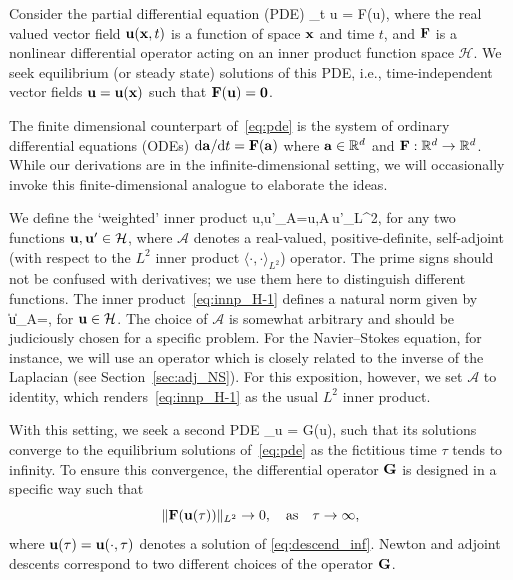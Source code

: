 \documentclass{article}
\begin{document}
Consider the partial differential equation (PDE)
\beq
\partial_t \vc u = \vc F(\vc u),
\label{eq:pde}
\eeq
where the real valued vector field
$\mathbf u(\mathbf x,t)$ is a function of space $\mathbf x$ and time $t$, and
$\mathbf F$ is a nonlinear differential operator acting on an inner product function space
$\mathcal H$. We seek equilibrium (or steady state) solutions of this PDE, i.e.,
time-independent vector fields $\mathbf u=\mathbf u(\mathbf x)$ such that $\mathbf F(\mathbf u)=\mathbf 0$.

The finite dimensional counterpart of~\eqref{eq:pde} is the system of ordinary differential
equations (ODEs) $\mbox d\mathbf a/\mbox d t=\mathbf F(\mathbf a)$ where $\mathbf a\in\mathbb R^d$ and
$\mathbf F:\mathbb R^d\to\mathbb R^d$. While our derivations are in the infinite-dimensional setting,
we will occasionally invoke this finite-dimensional analogue to elaborate the ideas.

We define the `weighted' inner product
\beq
\langle \vc u,\vc u'\rangle_{\mathcal A}=\langle \vc u,\mathcal A\,\vc u'\rangle_{L^2},
\label{eq:innp_H-1}
\eeq
for any two functions $\mathbf u,\mathbf u'\in\mathcal H$,
where $\mathcal A$ denotes a real-valued, positive-definite, self-adjoint (with respect to the $L^2$
inner product $\langle\cdot,\cdot\rangle_{L^2}$) operator.
The prime signs should not be confused with derivatives; we use them here
to distinguish different functions.
The inner product~\eqref{eq:innp_H-1} defines a natural norm given by
\beq
\|\vc u\|_{\mathcal A}=,
\label{eq:normA}
\eeq
for $\mathbf u\in\mathcal H$.
The choice of $\mathcal A$ is somewhat arbitrary and 
should be judiciously chosen for a specific
problem. For the Navier--Stokes equation, for instance, we will use an operator
which is closely related to the inverse of the Laplacian (see Section~\ref{sec:adj_NS}).
For this exposition, however, we set $\mathcal A$ to identity, which renders~\eqref{eq:innp_H-1}
as the usual $L^2$ inner product.

With this setting, we seek a second PDE
\beq
\partial_\tau\vc u = \vc G(\vc u),
\label{eq:descend_inf}
\eeq
such that its solutions
converge to the equilibrium solutions of~\eqref{eq:pde} as the fictitious
time $\tau$ tends to infinity.  To ensure this convergence, the differential operator $\mathbf G$ is
designed in a specific way such that
$$\|\mathbf F(\mathbf u(\tau))\|_{L^2}\to 0,\quad \mbox{as}\quad\tau\to\infty,$$
where $\mathbf u(\tau)= \mathbf u(\cdot, \tau)$ denotes a solution of \eqref{eq:descend_inf}.
Newton and adjoint descents correspond to two different choices of the operator
$\mathbf G$.
\end{document}
